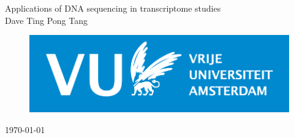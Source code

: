 \begin{titlepage}
\begin{center}



\LARGE{Applications of DNA sequencing in transcriptome studies}\\

Dave Ting Pong Tang

\begin{figure}[b]
   \centering
\includegraphics[width=\textwidth,height=\textheight,keepaspectratio]{../image/vu_logo.png}\\
\end{figure}

{\large \today}

\end{center}
\end{titlepage}
